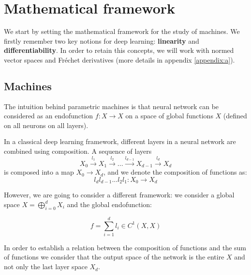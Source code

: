 \section{Mathematical framework}

We start by setting the mathematical framework for the study of machines. We firstly remember two key notions for deep learning: \textbf{linearity} and \textbf{differentiability}. In order to retain this concepts, we will work with normed vector spaces and Fréchet derivatives (more details in appendix \ref{appendix:a}).


\subsection{Machines}
The intuition behind parametric machines is that neural network can be considered as an endofunction $f : X \to X $ on a space of global functions $X$ (defined on all neurons on all layers). 

In a classical deep learning framework, different layers in a neural network are combined using composition. A sequence of layers
\begin{equation}
    X_0 \xrightarrow{l_1} X_1 \xrightarrow{l_2} ... \xrightarrow{l_{d-1}} X_{d-1} \xrightarrow{l_d} X_d
\end{equation}
is composed into a map $X_0 \to X_d$, and we denote the composition of functions as:
\begin{equation}
    l_dl_{d-1}...l_2l_1 : X_0 \to X_d
\end{equation}

However, we are going to consider a different framework: we consider a global space $X = \bigoplus_{i=0}^{d} X_i $ and the global endofunction:

\begin{equation}
    f = \sum_{i=1}^d l_i \in C^1(X,X)
\end{equation}

In order to establish a relation between the composition of functions and the sum of functions we consider that the output space of the network is the entire $X$ and not only the last layer space $X_d$. 
